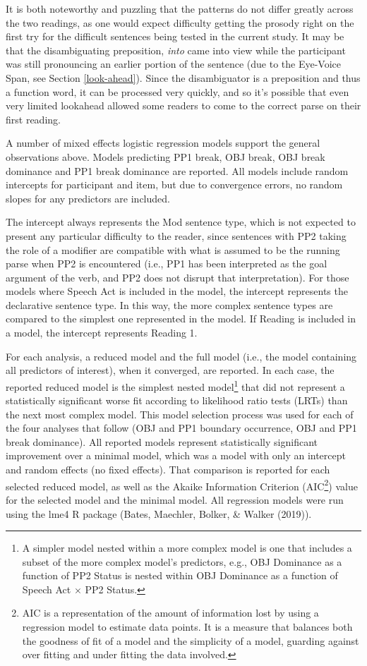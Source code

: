 \documentclass[11pt,oneside]{book}
\let\rmarkdownfootnote\footnote%
\def\footnote{\protect\rmarkdownfootnote}
\begin{document}
It is both noteworthy and puzzling that the patterns do not differ greatly across the two readings, as one would expect difficulty getting the prosody right on the first try for the difficult sentences being tested in the current study. It may be that the disambiguating preposition, \emph{into} came into view while the participant was still pronouncing an earlier portion of the sentence (due to the Eye-Voice Span, see Section \ref{look-ahead}). Since the disambiguator is a preposition and thus a function word, it can be processed very quickly, and so it's possible that even very limited lookahead allowed some readers to come to the correct parse on their first reading.

A number of mixed effects logistic regression models support the general observations above. Models predicting PP1 break, OBJ break, OBJ break dominance and PP1 break dominance are reported. All models include random intercepts for participant and item, but due to convergence errors, no random slopes for any predictors are included.

The intercept always represents the Mod sentence type, which is not expected to present any particular difficulty to the reader, since sentences with PP2 taking the role of a modifier are compatible with what is assumed to be the running parse when PP2 is encountered (i.e., PP1 has been interpreted as the goal argument of the verb, and PP2 does not disrupt that interpretation). For those models where Speech Act is included in the model, the intercept represents the declarative sentence type. In this way, the more complex sentence types are compared to the simplest one represented in the model. If Reading is included in a model, the intercept represents Reading 1.

For each analysis, a reduced model and the full model (i.e., the model containing all predictors of interest), when it converged, are reported. In each case, the reported reduced model is the simplest nested model\footnote{A simpler model nested within a more complex model is one that includes a subset of the more complex model's predictors, e.g., OBJ Dominance as a function of PP2 Status is nested within OBJ Dominance as a function of Speech Act \(\times\) PP2 Status.} that did not represent a statistically significant worse fit according to likelihood ratio tests (LRTs) than the next most complex model. This model selection process was used for each of the four analyses that follow (OBJ and PP1 boundary occurrence, OBJ and PP1 break dominance). All reported models represent statistically significant improvement over a minimal model, which was a model with only an intercept and random effects (no fixed effects). That comparison is reported for each selected reduced model, as well as the Akaike Information Criterion (AIC\footnote{AIC is a representation of the amount of information lost by using a regression model to estimate data points. It is a measure that balances both the goodness of fit of a model and the simplicity of a model, guarding against over fitting and under fitting the data involved.}) value for the selected model and the minimal model. All regression models were run using the lme4 R package (Bates, Maechler, Bolker, \& Walker (2019)).
\end{document}
